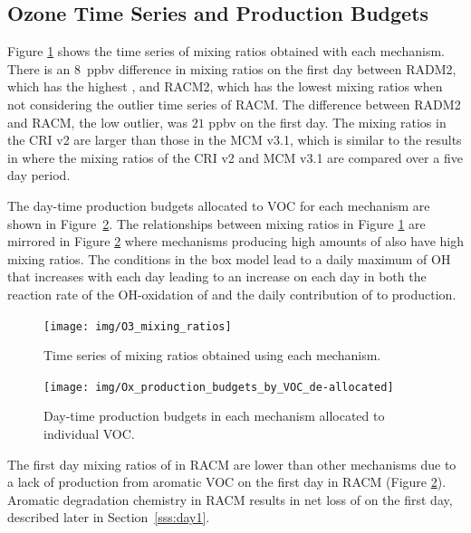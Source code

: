 %
\subsection[O3 Time Series and Ox Production Budgets]{Ozone Time Series and  Production Budgets} \label{ss:O3_time_series}
Figure \ref{f:time_series} shows the time series of  mixing ratios obtained with each mechanism.
There is an \mbox{$8$ ppbv} difference in  mixing ratios on the first day between RADM2, which has the highest , and RACM2, which has the lowest  mixing ratios when not considering the outlier time series of RACM.
The difference between RADM2 and RACM, the low outlier, was $21$ ppbv on the first day.
The  mixing ratios in the CRI v2 are larger than those in the MCM v3.1, which is similar to the results in \citet{Jenkin:2008} where the  mixing ratios of the CRI v2 and MCM v3.1 are compared over a five day period.

The day-time  production budgets allocated to VOC for each mechanism are shown in \mbox{Figure \ref{f:Ox_tagged_budgets}}.
The relationships between  mixing ratios in Figure \ref{f:time_series} are mirrored in Figure \ref{f:Ox_tagged_budgets} where mechanisms producing high amounts of  also have high  mixing ratios.
The conditions in the box model lead to a daily maximum of OH that increases with each day leading to an increase on each day in both the reaction rate of the OH-oxidation of  and the daily contribution of  to  production.
%
\begin{figure}[h!]
    \centering
    \caption{Time series of  mixing ratios obtained using each mechanism.}
    \texttt{[image: img/O3\_mixing\_ratios]}
    \vspace{-2mm}
    \label{f:time_series}
\end{figure}
%
\begin{figure}
    \centering
    \texttt{[image: img/Ox\_production\_budgets\_by\_VOC\_de-allocated]}
    \vspace{1mm}
    \caption{Day-time  production budgets in each mechanism allocated to individual VOC.}
    \vspace{-4mm}
    \label{f:Ox_tagged_budgets}
\end{figure}
%

The first day mixing ratios of  in RACM are lower than other mechanisms due to a lack of  production from aromatic VOC on the first day in RACM (Figure \ref{f:Ox_tagged_budgets}).
Aromatic degradation chemistry in RACM results in net loss of  on the first day, described later in \mbox{Section \ref{sss:day1}}.

